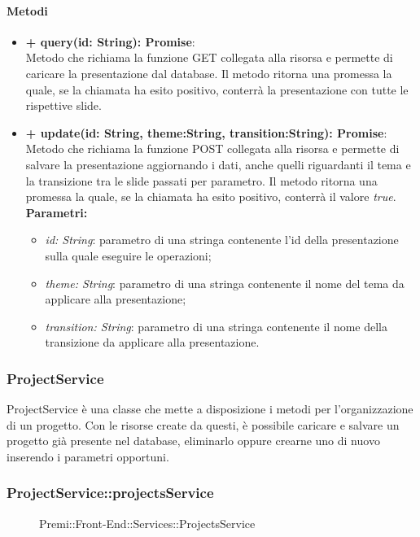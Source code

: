 		\paragraph{Metodi}
		\begin{itemize}
			\item \textbf{+ query(id: String): Promise}:\\
			Metodo che richiama la funzione GET collegata alla risorsa e permette di caricare la presentazione dal database. Il metodo ritorna una promessa la quale, se la chiamata ha esito positivo, conterrà la presentazione con tutte le rispettive slide.\\
			\item \textbf{+ update(id: String, theme:String, transition:String): Promise}:\\
			Metodo che richiama la funzione POST collegata alla risorsa e permette di salvare la presentazione aggiornando i dati, anche quelli riguardanti il tema e la transizione tra le slide passati per parametro. Il metodo ritorna una promessa la quale, se la chiamata ha esito positivo, conterrà il valore \textit{true}.\\
			\textbf{Parametri:}\\
			\begin{itemize}
				\item \textit{id: String}: parametro di una stringa contenente l'id della presentazione sulla quale eseguire le operazioni;
				\item \textit{theme: String}: parametro di una stringa contenente il nome del tema da applicare alla presentazione;
				\item \textit{transition: String}: parametro di una stringa contenente il nome della transizione da applicare alla presentazione.
			\end{itemize}
		\end{itemize}


\subsubsection{ProjectService}
ProjectService è una classe che mette a disposizione i metodi per l'organizzazione di un progetto. Con le risorse create da questi, è possibile caricare e salvare un progetto già presente nel database, eliminarlo oppure crearne uno di nuovo inserendo i parametri opportuni.

		\subsubsection{ProjectService::projectsService}
		\begin{figure}[h]
			\centering
			\caption[Premi::Front-End::Services::ProjectsService]{Premi::Front-End::Services::ProjectsService}
		\end{figure}
		
